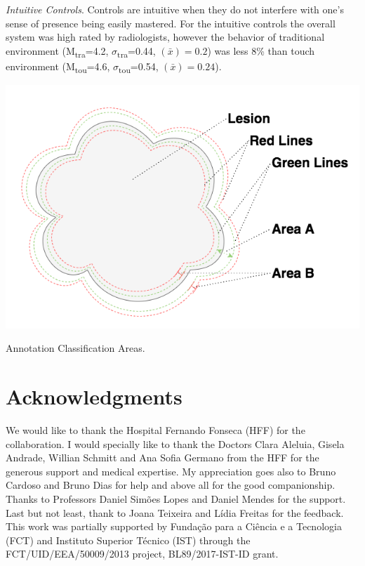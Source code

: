 \documentclass[sigchi-a, authorversion]{acmart}
\begin{document}
\textit{Intuitive Controls}. Controls are intuitive when they do not interfere with one's sense of presence being easily mastered. For the intuitive controls the overall system was high rated by radiologists, however the behavior of traditional environment (M\textsubscript{tra}=4.2, $\sigma$\textsubscript{tra}=0.44, {}$\left({\bar x}\right)=0.2$) was less 8\% than touch environment (M\textsubscript{tou}=4.6, $\sigma$\textsubscript{tou}=0.54, {}$\left({\bar x}\right)=0.24$).

\clearpage

\begin{marginfigure}
  \begin{center}
  \includegraphics[width=\marginparwidth]{mimbcd-ui_areas.png}
  \caption{Annotation Classification Areas.}
  \label{fig:Fig7}
  \end{center}
\end{marginfigure}


\section{Acknowledgments}

We would like to thank the Hospital Fernando Fonseca (HFF) for the collaboration. I would specially like to thank the Doctors Clara Aleluia, Gisela Andrade, Willian Schmitt and Ana Sofia Germano from the HFF for the generous support and medical expertise. My appreciation goes also to Bruno Cardoso and Bruno Dias for help and above all for the good companionship. Thanks to Professors Daniel Sim\~{o}es Lopes and Daniel Mendes for the support. Last but not least, thank to Joana Teixeira and L\'{i}dia Freitas for the feedback. This work was partially supported by Funda\c{c}\~{a}o para a Ci\^{e}ncia e a Tecnologia (FCT) and Instituto Superior T\'{e}cnico (IST) through the FCT/UID/EEA/50009/2013 project, BL89/2017-IST-ID grant.



\end{document}
